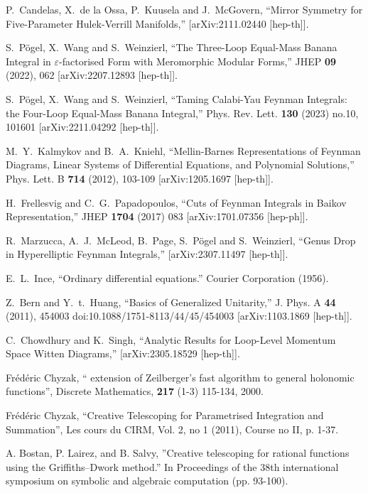 \documentclass[a4paper,12pt]{article}
\numberwithin{equation}{section}
\numberwithin{figure}{section}
\begin{document}
\begin{thebibliography}{99}
P.~Candelas, X.~de la Ossa, P.~Kuusela and J.~McGovern,
``Mirror Symmetry for Five-Parameter Hulek-Verrill Manifolds,''
[arXiv:2111.02440 [hep-th]].

S.~P\"ogel, X.~Wang and S.~Weinzierl,
``The Three-Loop Equal-Mass Banana Integral in \ensuremath{\varepsilon}-factorised Form with Meromorphic Modular Forms,''
JHEP \textbf{09} (2022), 062
[arXiv:2207.12893 [hep-th]].


S.~P\"ogel, X.~Wang and S.~Weinzierl,
``Taming Calabi-Yau Feynman Integrals: the Four-Loop Equal-Mass Banana Integral,''
Phys. Rev. Lett. \textbf{130} (2023) no.10, 101601
[arXiv:2211.04292 [hep-th]].


M.~Y.~Kalmykov and B.~A.~Kniehl,
``Mellin-Barnes Representations of Feynman Diagrams, Linear Systems of Differential Equations, and Polynomial Solutions,''
Phys. Lett. B \textbf{714} (2012), 103-109
[arXiv:1205.1697 [hep-th]].
  
  H.~Frellesvig and C.~G.~Papadopoulos,
  ``Cuts of Feynman Integrals in Baikov Representation,''
  JHEP {\bf 1704} (2017) 083
  [arXiv:1701.07356 [hep-ph]].
  
R.~Marzucca, A.~J.~McLeod, B.~Page, S.~P\"ogel and S.~Weinzierl,
``Genus Drop in Hyperelliptic Feynman Integrals,''
[arXiv:2307.11497 [hep-th]].

 E.~L.~Ince, ``Ordinary differential equations.''
  Courier Corporation  (1956).
 

  
Z.~Bern and Y.~t.~Huang,
``Basics of Generalized Unitarity,''
J. Phys. A \textbf{44} (2011), 454003
doi:10.1088/1751-8113/44/45/454003
[arXiv:1103.1869 [hep-th]].



C.~Chowdhury and K.~Singh,
``Analytic Results for Loop-Level Momentum Space Witten Diagrams,''
[arXiv:2305.18529 [hep-th]].

  Fr\'ed\'eric Chyzak, `` extension of
    Zeilberger's fast algorithm to general holonomic functions'',
Discrete Mathematics, {\bf 217} (1-3) 115-134, 2000.

 Fr\'ed\'eric Chyzak, ``Creative Telescoping for
  Parametrised Integration and Summation'',  Les cours du CIRM,  Vol. 2, no 1 (2011), Course no II, p. 1-37.

 A. Bostan, P. Lairez, and B. Salvy,
  ''Creative telescoping for rational functions using the
  Griffiths--Dwork method.'' In Proceedings of the 38th international
  symposium on symbolic and algebraic computation (pp. 93-100). 

	
	


\end{thebibliography}
\end{document}
